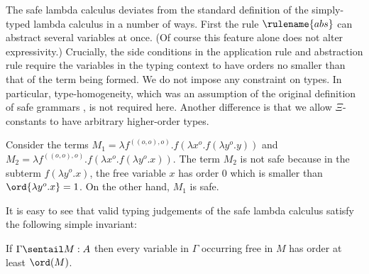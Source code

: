 The safe lambda calculus deviates from the standard definition of
the simply-typed lambda calculus in a number of ways. %
First the rule $\rulename{abs}$ can abstract several variables at once. (Of course this feature alone does not alter expressivity.) Crucially,
the side conditions in the application rule and abstraction rule
require the variables in the typing context to have orders no
smaller than that of the term being formed.  We do not impose any
constraint on types. In particular, type-homogeneity, which was an
assumption of the original definition of safe grammars \cite{KNU02},
is not required here. Another difference is that we allow
$\Xi$-constants to have
arbitrary higher-order types.
\bigskip


\begin{example}
\label{ex:kierstead}
Consider the terms $M_1 = \lambda f^{((o,o),o)} . f (\lambda x^o . f (\lambda y^o . y
))$ and $M_2 = \lambda f^{((o,o),o)} . f (\lambda x^o . f (\lambda y^o .x ))$. The term $M_2$ is not safe because in the subterm $f (\lambda y^o . x)$, the free variable $x$ has order $0$ which
is smaller than $\ord{\lambda y^o . x} = 1$.  On the other hand, $M_1$
is safe.
\end{example}

It is easy to see that valid typing judgements of the safe lambda
calculus satisfy the following simple invariant:
\begin{lemma}
\label{lem:ordfreevar}
If $\Gamma \sentail M : A$ then every variable in $\Gamma$ occurring
free in $M$ has order at least $\ord(M)$.
\end{lemma}


